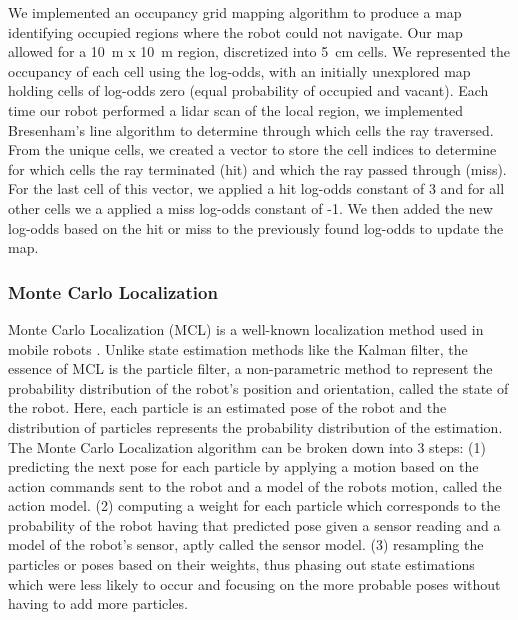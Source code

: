 \documentclass[journal]{IEEEtran}
\begin{document}
        We implemented an occupancy grid mapping algorithm to produce a map identifying occupied regions where the robot could not navigate. Our map allowed for a \SI{10}{\meter} x \SI{10}{\meter} region, discretized into \SI{5}{\centi\meter} cells. We represented the occupancy of each cell using the log-odds, with an initially unexplored map holding cells of log-odds zero (equal probability of occupied and vacant).
        Each time our robot performed a lidar scan of the local region, we implemented Bresenham’s line algorithm \cite{lecture12} to determine through which cells the ray traversed. From the unique cells, we created a vector to store the cell indices to determine for which cells the ray terminated (hit) and which the ray passed through (miss). For the last cell of this vector, we applied a hit log-odds constant of 3 and for all other cells we a applied a miss log-odds constant of -1. We then added the new log-odds based on the hit or miss to the previously found log-odds to update the map.

        \subsubsection{Monte Carlo Localization}
            
            
            Monte Carlo Localization (MCL) is a well-known localization method used in mobile robots \cite{Fox99Mon}. Unlike state estimation methods like the Kalman filter, the essence of MCL is the particle filter, a non-parametric method to represent the probability distribution of the robot's position and orientation, called the state of the robot. Here, each particle is an estimated pose of the robot and the distribution of particles represents the probability distribution of the estimation. 
            The Monte Carlo Localization algorithm can be broken down into 3 steps: (1) predicting the next pose for each particle by applying a motion based on the action commands sent to the robot and a model of the robots motion, called the action model. (2) computing a weight for each particle which corresponds to the probability of the robot having that predicted pose given a sensor reading and a model of the robot's sensor, aptly called the sensor model. (3) resampling the particles or poses based on their weights, thus phasing out state estimations which were less likely to occur and focusing on the more probable poses without having to add more particles. 
        
\end{document}
